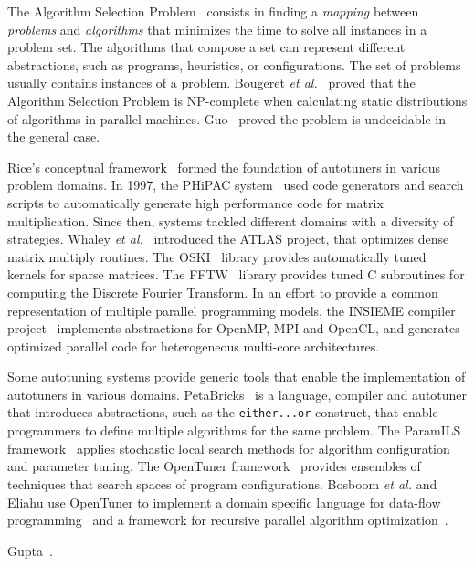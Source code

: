 \documentclass[a4paper, 12pt]{article}
\begin{document}
The Algorithm Selection Problem~\cite{rice1976algorithm} consists in finding a
\emph{mapping} between \emph{problems} and \emph{algorithms} that minimizes the
time to solve all instances in a problem set. The algorithms that compose a set
can represent different abstractions, such as programs, heuristics, or
configurations. The set of problems usually contains instances of a problem.
Bougeret \emph{et al.}~\cite{bougeret2009combining} proved that the Algorithm
Selection Problem is NP-complete when calculating static distributions of
algorithms in parallel machines.  Guo~\cite{guo2003algorithm} proved the
problem is undecidable in the general case.

Rice's conceptual framework~\cite{rice1976algorithm} formed the foundation 
of autotuners in various problem domains.  In 1997, the PHiPAC 
system~\cite{bilmes1997phipac} used code generators and search scripts to 
automatically generate high performance code
for matrix multiplication. Since then, systems tackled different domains with a
diversity of strategies. Whaley \emph{et al.}~\cite{whaley1998atlas} introduced
the ATLAS project, that optimizes dense matrix multiply routines. The
OSKI~\cite{vuduc2005oski} library provides automatically tuned kernels for
sparse matrices. The FFTW~\cite{frigo1998fftw} library provides tuned C
subroutines for computing the Discrete Fourier Transform.  In an effort to
provide a common representation of multiple parallel programming models, the
INSIEME compiler project~\cite{jordan2012multi} implements abstractions for
OpenMP, MPI and OpenCL, and generates optimized parallel code for heterogeneous
multi-core architectures.

Some autotuning systems provide generic tools that enable the implementation of
autotuners in various domains. PetaBricks~\cite{ansel2009petabricks} is a
language, compiler and autotuner that introduces abstractions, such as the
\texttt{\footnotesize either...or} construct, that enable programmers to define
multiple algorithms for the same problem.  The ParamILS
framework~\cite{hutter2009paramils} applies stochastic local search methods
for algorithm configuration and parameter tuning.  The OpenTuner
framework~\cite{ansel2014opentuner} provides ensembles of techniques that
search spaces of program configurations. Bosboom \emph{et al.} and Eliahu use
OpenTuner to implement a domain specific language for data-flow
programming~\cite{bosboom2014streamjit} and a framework for recursive parallel
algorithm optimization~\cite{eliahu2015frpa}.

Gupta~\cite{gupta2012exploring,gupta2014evaluating}.
\end{document}
